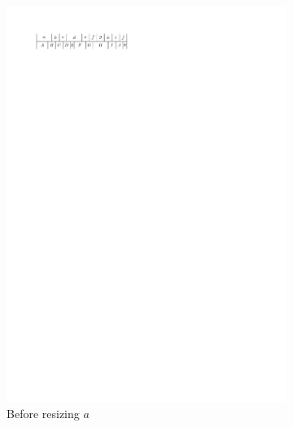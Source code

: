 \begin{figure}[t]
    \quad
    \begin{subfigure}[b]{0.45 \textwidth}
      \centering
      \includegraphics[width=\textwidth]{introduction/img/10sidedBefore.pdf}
      \caption{Before resizing $a$}
      \label{fig:intro:10sidedBefore}
    \end{subfigure}
    \hfill
    \begin{subfigure}[b]{0.45 \textwidth}
      \centering

\end{subfigure}
\end{figure}
